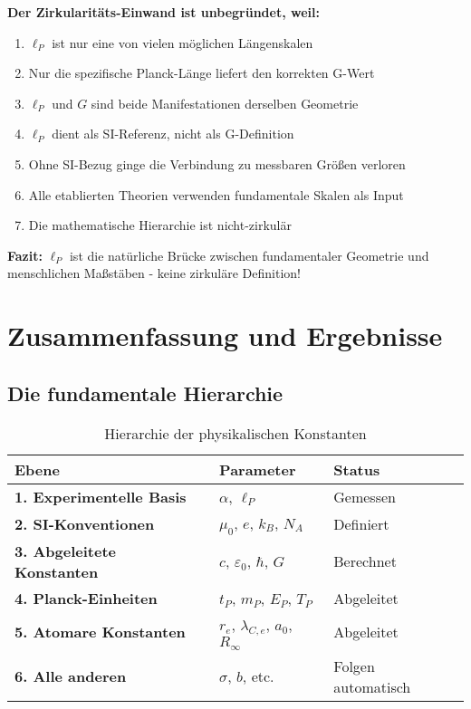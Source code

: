 \documentclass[12pt,a4paper]{article}
\theoremstyle{definition}
\begin{document}
	\begin{tcolorbox}[colback=yellow!10!white,colframe=orange!75!black,title=Endg\"ultige Widerlegung]
		\textbf{Der Zirkularit\"ats-Einwand ist unbegr\"undet, weil:}
		
		\begin{enumerate}
			\item $\ell_P$ ist nur eine von vielen m\"oglichen L\"angenskalen
			\item Nur die spezifische Planck-L\"ange liefert den korrekten G-Wert  
			\item $\ell_P$ und $G$ sind beide Manifestationen derselben Geometrie
			\item $\ell_P$ dient als SI-Referenz, nicht als G-Definition
			\item Ohne SI-Bezug ginge die Verbindung zu messbaren Gr\"o\ss{}en verloren
			\item Alle etablierten Theorien verwenden fundamentale Skalen als Input
			\item Die mathematische Hierarchie ist nicht-zirkul\"ar
		\end{enumerate}
		
		\textbf{Fazit:} $\ell_P$ ist die nat\"urliche Br\"ucke zwischen fundamentaler Geometrie und menschlichen Ma\ss{}st\"aben - keine zirkul\"are Definition!
	\end{tcolorbox}
	
	\section{Zusammenfassung und Ergebnisse}
	
	\subsection{Die fundamentale Hierarchie}
	
	\begin{table}[h]
		\centering
		\begin{tabular}{|l|l|l|}
			\hline
			\textbf{Ebene} & \textbf{Parameter} & \textbf{Status} \\
			\hline
			\textbf{1. Experimentelle Basis} & $\alpha$, $\ell_P$ & Gemessen \\
			\textbf{2. SI-Konventionen} & $\mu_0$, $e$, $k_B$, $N_A$ & Definiert \\
			\textbf{3. Abgeleitete Konstanten} & $c$, $\varepsilon_0$, $\hbar$, $G$ & Berechnet \\
			\textbf{4. Planck-Einheiten} & $t_P$, $m_P$, $E_P$, $T_P$ & Abgeleitet \\
			\textbf{5. Atomare Konstanten} & $r_e$, $\lambda_{C,e}$, $a_0$, $R_\infty$ & Abgeleitet \\
			\textbf{6. Alle anderen} & $\sigma$, $b$, etc. & Folgen automatisch \\
			\hline
		\end{tabular}
		\caption{Hierarchie der physikalischen Konstanten}
	\end{table}
	
\end{document}
